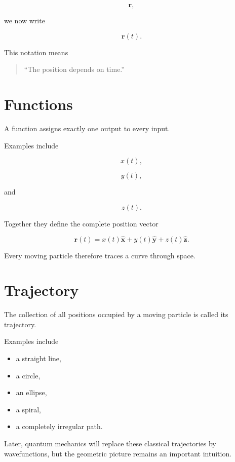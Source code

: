 \documentclass[11pt,a4paper,openany]{book}
\begin{document}
\[
\mathbf r,
\]

we now write

\[
\boxed{
	\mathbf r(t).
}
\]

This notation means

\begin{quote}
	``The position depends on time.''
\end{quote}


\section{Functions}

A function assigns exactly one output to every input.

Examples include

\[
x(t),
\]

\[
y(t),
\]

and

\[
z(t).
\]

Together they define the complete position vector

\[
\boxed{
	\mathbf r(t)
	=
	x(t)\hat{\mathbf x}
	+
	y(t)\hat{\mathbf y}
	+
	z(t)\hat{\mathbf z}.
}
\]

Every moving particle therefore traces a curve through space.


\section{Trajectory}

The collection of all positions occupied by a moving particle is called its
trajectory.

Examples include

\begin{itemize}
	\item a straight line,
	\item a circle,
	\item an ellipse,
	\item a spiral,
	\item a completely irregular path.
\end{itemize}

Later, quantum mechanics will replace these classical trajectories by
wavefunctions, but the geometric picture remains an important intuition.
\end{document}
